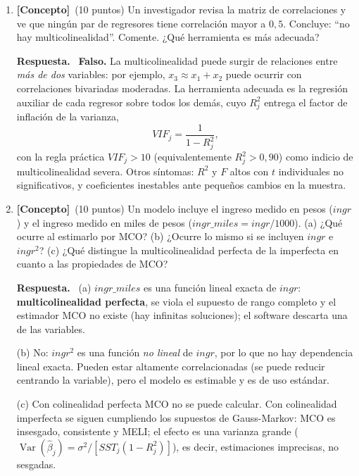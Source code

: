 \documentclass[12pt,letterpaper]{article}
\DeclareMathOperator{\var}{Var}
\newenvironment{resp}{\begingroup\color{blue}\par\noindent\textbf{Respuesta.}\ }{\par\endgroup}
\newcommand{\conc}{\textbf{[Concepto]}}
\begin{document}
\begin{enumerate}[1.]

\item \conc\ (10 puntos) Un investigador revisa la matriz de correlaciones y ve que ningún par de regresores tiene correlación mayor a $0{,}5$. Concluye: ``no hay multicolinealidad''. Comente. ¿Qué herramienta es más adecuada?

\begin{resp}
\textbf{Falso.} La multicolinealidad puede surgir de relaciones entre \emph{más de dos} variables: por ejemplo, $x_3\approx x_1+x_2$ puede ocurrir con correlaciones bivariadas moderadas. La herramienta adecuada es la regresión auxiliar de cada regresor sobre todos los demás, cuyo $R^2_j$ entrega el factor de inflación de la varianza,
\[
VIF_j=\frac{1}{1-R^2_j},
\]
con la regla práctica $VIF_j>10$ (equivalentemente $R^2_j>0{,}90$) como indicio de multicolinealidad severa. Otros síntomas: $R^2$ y $F$ altos con $t$ individuales no significativos, y coeficientes inestables ante pequeños cambios en la muestra.
\end{resp}

\item \conc\ (10 puntos) Un modelo incluye el ingreso medido en pesos ($ingr$) y el ingreso medido en miles de pesos ($ingr\_miles=ingr/1000$). (a) ¿Qué ocurre al estimarlo por MCO? (b) ¿Ocurre lo mismo si se incluyen $ingr$ e $ingr^2$? (c) ¿Qué distingue la multicolinealidad perfecta de la imperfecta en cuanto a las propiedades de MCO?

\begin{resp}
(a) $ingr\_miles$ es una función lineal exacta de $ingr$: \textbf{multicolinealidad perfecta}, se viola el supuesto de rango completo y el estimador MCO no existe (hay infinitas soluciones); el software descarta una de las variables.

(b) No: $ingr^2$ es una función \emph{no lineal} de $ingr$, por lo que no hay dependencia lineal exacta. Pueden estar altamente correlacionadas (se puede reducir centrando la variable), pero el modelo es estimable y es de uso estándar.

(c) Con colinealidad perfecta MCO no se puede calcular. Con colinealidad imperfecta se siguen cumpliendo los supuestos de Gauss-Markov: MCO es insesgado, consistente y MELI; el efecto es una varianza grande ($\var(\hat\beta_j)=\sigma^2/[SST_j(1-R^2_j)]$), es decir, estimaciones imprecisas, no sesgadas.
\end{resp}


\end{enumerate}
\end{document}
